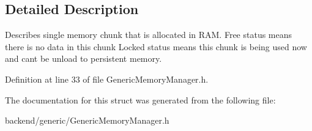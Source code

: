 \subsection{Detailed Description}
Describes single memory chunk that is allocated in R\+AM. Free status means there is no data in this chunk Locked status means this chunk is being used now and can\textquotesingle{}t be unload to persistent memory. 

Definition at line 33 of file Generic\+Memory\+Manager.\+h.



The documentation for this struct was generated from the following file\+:\begin{DoxyCompactItemize}
\item 
backend/generic/Generic\+Memory\+Manager.\+h\end{DoxyCompactItemize}
